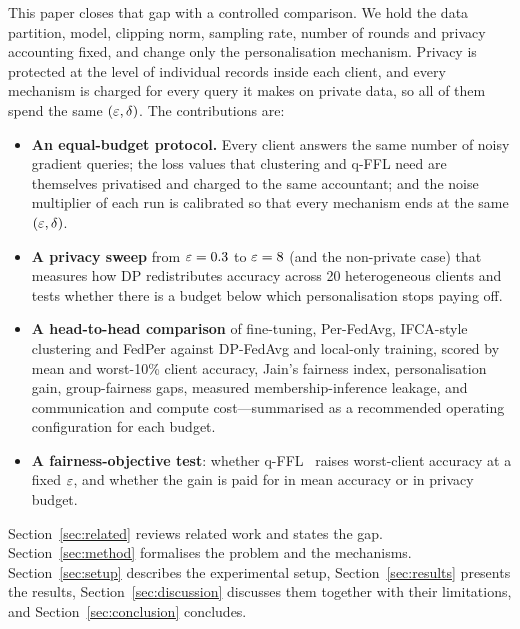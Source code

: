 This paper closes that gap with a controlled comparison. We hold the data partition, model, clipping norm, sampling
rate, number of rounds and privacy accounting fixed, and change only the personalisation mechanism. Privacy is
protected at the level of individual records inside each client, and every mechanism is charged for every query it
makes on private data, so all of them spend the same $(\varepsilon,\delta)$. The contributions are:
\begin{itemize}
  \item \textbf{An equal-budget protocol.} Every client answers the same number of noisy gradient queries; the loss
  values that clustering and q-FFL need are themselves privatised and charged to the same accountant; and the noise
  multiplier of each run is calibrated so that every mechanism ends at the same $(\varepsilon,\delta)$.
  \item \textbf{A privacy sweep} from $\varepsilon=0.3$ to $\varepsilon=8$ (and the non-private case) that measures how DP
  redistributes accuracy across 20 heterogeneous clients and tests whether there is a budget below which
  personalisation stops paying off.
  \item \textbf{A head-to-head comparison} of fine-tuning, Per-FedAvg, IFCA-style clustering and FedPer against
  DP-FedAvg and local-only training, scored by mean and worst-10\% client accuracy, Jain's fairness index,
  personalisation gain, group-fairness gaps, measured membership-inference leakage, and communication and compute
  cost---summarised as a recommended operating configuration for each budget.
  \item \textbf{A fairness-objective test}: whether q-FFL~\cite{li2020fair} raises worst-client accuracy at a fixed
  $\varepsilon$, and whether the gain is paid for in mean accuracy or in privacy budget.
\end{itemize}

Section~\ref{sec:related} reviews related work and states the gap. Section~\ref{sec:method} formalises the problem
and the mechanisms. Section~\ref{sec:setup} describes the experimental setup, Section~\ref{sec:results} presents the
results, Section~\ref{sec:discussion} discusses them together with their limitations, and
Section~\ref{sec:conclusion} concludes.

